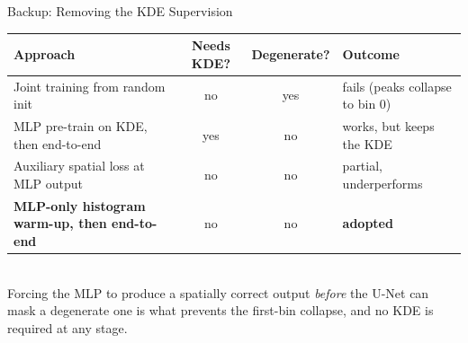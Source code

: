 \documentclass[xcolor=table,aspectratio=169]{beamer}
\begin{document}
\begin{frame}{Backup: Removing the KDE Supervision}
    \vfill
    \centering
    \scriptsize
    \setlength{\tabcolsep}{4pt}
    \begin{tabular}{lccl}
        \toprule
        Approach & Needs KDE? & Degenerate? & Outcome \\
        \midrule
        Joint training from random init & no & yes & fails (peaks collapse to bin 0) \\
        MLP pre-train on KDE, then end-to-end & yes & no & works, but keeps the KDE \\
        Auxiliary spatial loss at MLP output & no & no & partial, underperforms \\
        \textbf{MLP-only histogram warm-up, then end-to-end} & no & no & \textbf{adopted} \\
        \bottomrule
    \end{tabular}
    \vspace{1em}\\
    {\footnotesize Forcing the MLP to produce a spatially correct output \emph{before}
    the U-Net can mask a degenerate one is what prevents the first-bin collapse,
    and no KDE is required at any stage.}
    \vfill
\end{frame}
\end{document}
